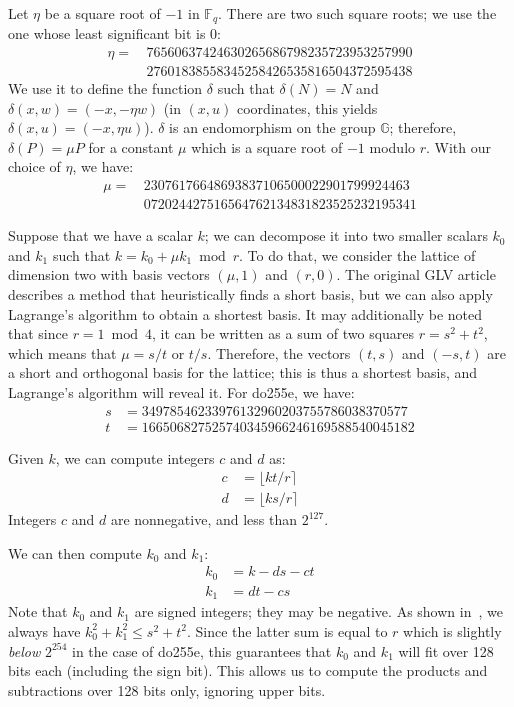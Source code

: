 \documentclass{llncs}
\newcommand{\bF}{\mathbb{F}}
\newcommand{\bG}{\mathbb{G}}
\begin{document}
Let $\eta$ be a square root of $-1$ in $\bF_q$. There are two such square
roots; we use the one whose least significant bit is 0:
\begin{align*}
    \eta =&\,76560637424630265686798235723953257990 \\
          &\,27601838558345258426535816504372595438
\end{align*}
We use it to define the function $\delta$ such that $\delta(N) = N$
and $\delta(x, w) = (-x, -\eta w)$ (in $(x, u)$ coordinates, this
yields $\delta(x, u) = (-x, \eta u)$). $\delta$ is an endomorphism
on the group $\bG$; therefore, $\delta(P) = \mu P$ for a constant $\mu$
which is a square root of $-1$ modulo $r$. With our choice of $\eta$,
we have:
\begin{align*}
    \mu =&\,23076176648693837106500022901799924463 \\
         &\,072024427516564762134831823525232195341
\end{align*}

Suppose that we have a scalar $k$; we can decompose it into two smaller
scalars $k_0$ and $k_1$ such that $k = k_0 + \mu k_1 \bmod r$. To do
that, we consider the lattice of dimension two with basis vectors $(\mu,
1)$ and $(r, 0)$. The original GLV article\cite{GalLamVan2001} describes
a method that heuristically finds a short basis, but we can also apply
Lagrange's algorithm to obtain a shortest basis\cite{Por2020-2}. It
may additionally be noted that since $r = 1\bmod 4$, it can be written
as a sum of two squares $r = s^2 + t^2$, which means that $\mu = s/t$
or $t/s$. Therefore, the vectors $(t, s)$ and $(-s, t)$ are a short and
orthogonal basis for the lattice; this is thus a shortest basis, and
Lagrange's algorithm will reveal it. For do255e, we have:
\begin{align*}
    s &=  34978546233976132960203755786038370577 \\
    t &= 166506827525740345966246169588540045182
\end{align*}

Given $k$, we can compute integers $c$ and $d$ as:
\begin{align*}
    c &= \lfloor kt / r \rceil \\
    d &= \lfloor ks / r \rceil
\end{align*}
Integers $c$ and $d$ are nonnegative, and less than $2^{127}$.

We can then compute $k_0$ and $k_1$:
\begin{align*}
    k_0 &= k - ds - ct \\
    k_1 &= dt - cs
\end{align*}
Note that $k_0$ and $k_1$ are signed integers; they may be negative.
As shown in~\cite{GalLamVan2001}, we always have
$k_0^2 + k_1^2 \leq s^2 + t^2$. Since the latter sum is equal to $r$ which
is slightly \emph{below} $2^{254}$ in the case of do255e, this guarantees
that $k_0$ and $k_1$ will fit over 128 bits each (including the sign bit).
This allows us to compute the products and subtractions over 128 bits
only, ignoring upper bits.
\end{document}
